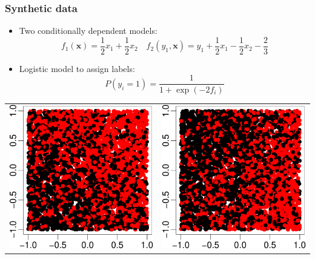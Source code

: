 \documentclass[]{beamer}
\renewcommand{\Pr}{P}
\newcommand{\bx}{\boldsymbol{x}}
\begin{document}
\begin{frame}
\frametitle{Synthetic data}

\begin{itemize}
\item Two conditionally dependent models:
$$
f_1(\bx) = \frac{1}{2} x_1 + \frac{1}{2} x_2 \quad f_2(y_1, \bx) = y_1 + \frac{1}{2} x_1 - \frac{1}{2} x_2 - \frac{2}{3}
$$
\item Logistic model to assign labels:
$$
\Pr(y_i = 1) = \frac{1}{1 + \exp(-2f_i)}
$$
\end{itemize}
\vskip12pt
\begin{center}
\begin{tabular}{@{}c@{$\quad\quad\quad$}c@{}}
\includegraphics[width = .35\textwidth]{pics/dep-1.pdf} &
\includegraphics[width = .35\textwidth]{pics/dep-2.pdf} \\
\end{tabular}
\end{center}

\end{frame}

\end{document}
